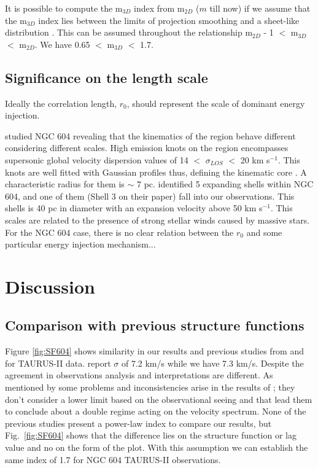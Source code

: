 \documentclass[fleqn,usenatbib, useAMS, a4paper]{mnras}
\begin{document}
It is possible to compute the m$_{3D}$ index from m$_{2D}$ ($m$ till now) if we assume that the m$_{3D}$ index lies between the limits of projection smoothing and a sheet-like distribution \citep{arthur2016turbulence}.
This can be assumed throughout the relationship m$_{2D}$ - 1 $<$ m$_{3D}$ $<$ m$_{2D}$.
We have 0.65 $<$ m$_{3D}$ $<$ 1.7.

\subsection{Significance on the length scale}

Ideally the correlation length, \(r_0\), should represent the scale of dominant energy injection.


\citet{sabalisck1995supersonic} studied NGC 604 revealing that the kinematics of the region behave different considering different scales.
High emission knots on the region encompasses supersonic global velocity dispersion values of 14 $<$ \(\sigma_{LOS}\) $<$ 20 km s\(^{-1}\).
This knots are well fitted with Gaussian profiles thus, defining the kinematic core \citet{munoz1996}.
A characteristic radius for them is \(\sim\) 7 pc.
\citet{yang1996} identified 5 expanding shells within NGC 604, and one of them (Shell 3 on their paper) fall into our observations.
This shells is 40 pc in diameter with an expansion velocity above 50 km s\(^{-1}\).
This scales are related to the presence of strong stellar winds caused by massive stars.
For the NGC 604 case, there is no clear relation between the \(r_0\) and some particular energy injection mechanism...







\section{Discussion}\label{sec:discussion}

\subsection{Comparison with previous structure functions}

Figure \ref{fig:SF604} shows similarity in our results and previous studies from \citet{tanco1997} and \citet{2019arXiv191203543M} for TAURUS-II data.
\citep{2019arXiv191203543M} report $\sigma$ of 7.2 km/s while we have 7.3 km/s.
Despite the agreement in observations analysis and interpretations are different.
As mentioned by \citet{2019arXiv191203543M} some problems and inconsistencies arise in the results of \citet{tanco1997}; they don't consider a lower limit based on the observational seeing and that lead them to conclude about a double regime acting on the velocity spectrum.
None of the previous studies present a power-law index to compare our results, but Fig.~\ref{fig:SF604} shows that the difference lies on the structure function or lag value and no on the form of the plot.
With this assumption we can establish the same index of 1.7 for NGC 604 TAURUS-II observations.
\end{document}

